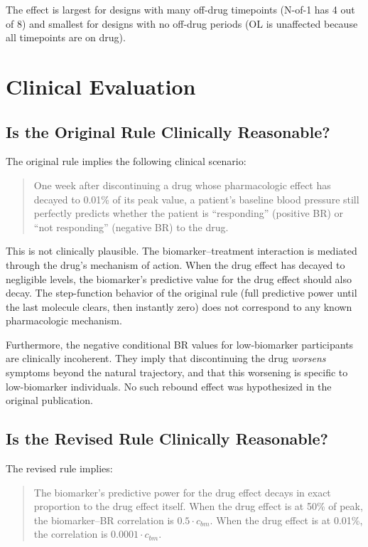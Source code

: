\documentclass[11pt]{article}
\begin{document}
The effect is largest for designs with many off-drug timepoints
(N-of-1 has 4 out of 8) and smallest for designs with no
off-drug periods (OL is unaffected because all timepoints are
on drug).

\section{Clinical Evaluation}

\subsection{Is the Original Rule Clinically Reasonable?}

The original rule implies the following clinical scenario:

\begin{quote}
One week after discontinuing a drug whose pharmacologic
effect has decayed to 0.01\% of its peak value, a patient's
baseline blood pressure still perfectly predicts whether the
patient is ``responding'' (positive BR) or ``not responding''
(negative BR) to the drug.
\end{quote}

This is not clinically plausible. The biomarker--treatment
interaction is mediated through the drug's mechanism of action.
When the drug effect has decayed to negligible levels, the
biomarker's predictive value for the drug effect should also
decay. The step-function behavior of the original rule (full
predictive power until the last molecule clears, then
instantly zero) does not correspond to any known pharmacologic
mechanism.

Furthermore, the negative conditional BR values for
low-biomarker participants are clinically incoherent. They
imply that discontinuing the drug \emph{worsens} symptoms
beyond the natural trajectory, and that this worsening is
specific to low-biomarker individuals. No such rebound effect
was hypothesized in the original publication.

\subsection{Is the Revised Rule Clinically Reasonable?}

The revised rule implies:

\begin{quote}
The biomarker's predictive power for the drug effect decays
in exact proportion to the drug effect itself. When the drug
effect is at 50\% of peak, the biomarker--BR correlation is
$0.5 \cdot c_{bm}$. When the drug effect is at 0.01\%,
the correlation is $0.0001 \cdot c_{bm}$.
\end{quote}
\end{document}
